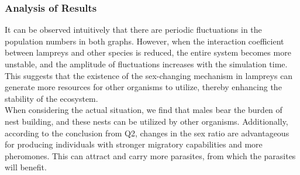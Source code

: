 \documentclass[12pt]{article}
\begin{document}
\subsubsection{Analysis of Results}
It can be observed intuitively that there are periodic fluctuations in the population numbers in 
both graphs. However, when the interaction coefficient between lampreys and other species is 
reduced, the entire system becomes more unstable, and the amplitude of fluctuations increases 
with the simulation time. This suggests that the existence of the sex-changing mechanism in 
lampreys can generate more resources for other organisms to utilize, thereby enhancing the 
stability of the ecosystem.\\
When considering the actual situation, we find that males bear the burden of nest building, and 
these nests can be utilized by other organisms. Additionally, according to the conclusion 
from Q2, changes in the sex ratio are advantageous for producing individuals with stronger 
migratory capabilities and more pheromones. This can attract and carry more parasites, from 
which the parasites will benefit.
\end{document}
